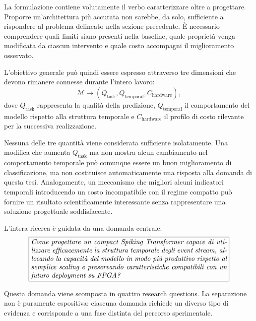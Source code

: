 La formulazione contiene volutamente il verbo caratterizzare oltre a progettare. Proporre un'architettura più accurata non sarebbe, da solo, sufficiente a rispondere al problema delineato nella sezione precedente. È necessario comprendere quali limiti siano presenti nella baseline, quale proprietà venga modificata da ciascun intervento e quale costo accompagni il miglioramento osservato.

L'obiettivo generale può quindi essere espresso attraverso tre dimensioni che devono rimanere connesse durante l'intero lavoro:
\begin{equation}
\label{eq:dimensioni_lavoro}
\mathcal{M} \longrightarrow \left( Q_{\mathrm{task}}, Q_{\mathrm{temporal}}, C_{\mathrm{hardware}} \right),
\end{equation}
dove $Q_{\mathrm{task}}$ rappresenta la qualità della predizione, $Q_{\mathrm{temporal}}$ il comportamento del modello rispetto alla struttura temporale e $C_{\mathrm{hardware}}$ il profilo di costo rilevante per la successiva realizzazione.

Nessuna delle tre quantità viene considerata sufficiente isolatamente. Una modifica che aumenta $Q_{\mathrm{task}}$ ma non mostra alcun cambiamento nel comportamento temporale può comunque essere un buon miglioramento di classificazione, ma non costituisce automaticamente una risposta alla domanda di questa tesi. Analogamente, un meccanismo che migliori alcuni indicatori temporali introducendo un costo incompatibile con il regime compatto può fornire un risultato scientificamente interessante senza rappresentare una soluzione progettuale soddisfacente.

L'intera ricerca è guidata da una domanda centrale:
\begin{equation}
\label{eq:domanda_centrale}
\boxed{
\begin{minipage}{0.82\textwidth}
\itshape
Come progettare un compact Spiking Transformer capace di utilizzare efficacemente la struttura temporale degli event stream, allocando la capacità del modello in modo più produttivo rispetto al semplice scaling e preservando caratteristiche compatibili con un futuro deployment su FPGA?
\end{minipage}
}
\end{equation}

Questa domanda viene scomposta in quattro research questions. La separazione non è puramente espositiva: ciascuna domanda richiede un diverso tipo di evidenza e corrisponde a una fase distinta del percorso sperimentale.

